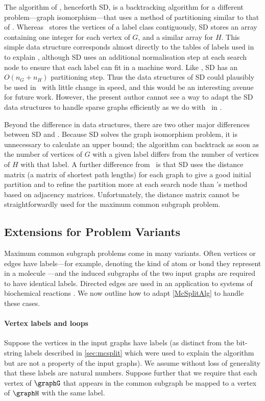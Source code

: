 The algorithm of \citet{DBLP:journals/jacm/SchmidtD76},
henceforth SD, is a backtracking algorithm for a different
problem---graph isomorphism---that uses a method of partitioning
similar to that of \McSplit. Whereas \McSplit\ stores the vertices of a label
class contiguously, SD stores an array containing one integer for each vertex
of $G$, and a similar array for $H$.
This simple data
structure corresponds almost directly to the tables of labels used in
 to explain \McSplit, although SD uses an
additional normalisation step at each search node to ensure that each label can
fit in a machine word.  Like \McSplit, SD has an $O(n_G + n_H)$ partitioning
step. Thus the data structures of SD could plausibly be used in \McSplit\ with
little change in speed, and this would be an interesting avenue for future
work.  However, the present author cannot see a way to adapt the SD data
structures to handle sparse graphs efficiently as we do with \McSplit\ in
.

Beyond the difference in data structures, there are two other
major differences between SD and \McSplit.
Because SD solves the
graph isomorphism problem, it is unnecessary to calculate an upper bound; the
algorithm can backtrack as soon as the number of vertices of $G$ with a given
label differs from the number of vertices of $H$ with that label.  A further
difference from \McSplit\ is that SD uses
the distance matrix (a matrix of shortest path lengths) for each
graph to give a good initial partition and to refine the partition more at each
search node than \McSplit's method based on adjacency matrices. Unfortunately,
the distance matrix cannot be straightforwardly used for the maximum common
subgraph problem.

\subsection{Extensions for Problem Variants}\label{sec:extensions}

Maximum common subgraph problems come in many variants. Often
vertices or edges have labels---for example, denoting the kind of atom or bond they represent in
a molecule \citep{Ehrlich:2011}---and the induced subgraphs of the two input graphs are
required to have identical labels.  Directed edges are used in an application to systems
of biochemical reactions \citep{DAM2014}.
We now outline how to adapt \cref{McSplitAlg} to handle these cases.

\paragraph{Vertex labels and loops} Suppose the vertices in the input graphs have labels
(as distinct from the bit-string labels described in \cref{sec:mcsplit} which were used to
explain the algorithm but are not a property of the input graphs). We assume without loss
of generality that these labels are natural numbers. Suppose further that
we require that each vertex of $\graphG$ that appears in the common subgraph be mapped to a vertex
of $\graphH$ with the same label.

